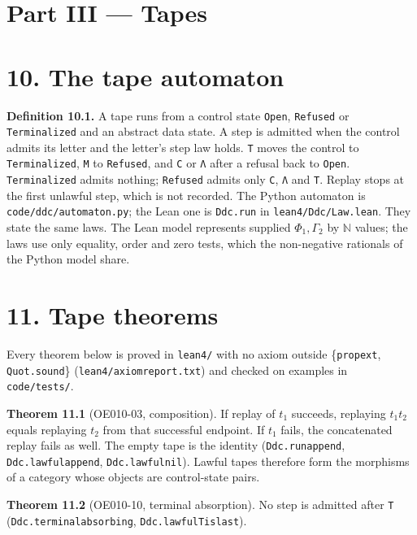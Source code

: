 \documentclass[
  11pt,
]{article}
\renewcommand{\_}{\ddcunderscore\allowbreak}
\begin{document}
\section{Part III --- Tapes}\label{part-iii-tapes}

\section{10. The tape automaton}\label{the-tape-automaton}

\textbf{Definition 10.1.} A tape runs from a control state
\texttt{Open}, \texttt{Refused} or \texttt{Terminalized} and an abstract
data state. A step is admitted when the control admits its letter and
the letter's step law holds. \texttt{T} moves the control to
\texttt{Terminalized}, \texttt{M} to \texttt{Refused}, and \texttt{C} or
\texttt{Λ} after a refusal back to \texttt{Open}. \texttt{Terminalized}
admits nothing; \texttt{Refused} admits only \texttt{C}, \texttt{Λ} and
\texttt{T}. Replay stops at the first unlawful step, which is not
recorded. The Python automaton is \texttt{code/\allowbreak ddc/\allowbreak automaton.\allowbreak py}; the
Lean one is \texttt{Ddc.\allowbreak run} in \texttt{lean4/\allowbreak Ddc/\allowbreak Law.\allowbreak lean}. They state
the same laws. The Lean model represents supplied \(\Phi_1, \Gamma_2\)
by \(\mathbb{N}\) values; the laws use only equality, order and zero
tests, which the non-negative rationals of the Python model share.

\section{11. Tape theorems}\label{tape-theorems}

Every theorem below is proved in \texttt{lean4/\allowbreak } with no axiom outside
\{\texttt{propext}, \texttt{Quot.\allowbreak sound}\}
(\texttt{lean4/\allowbreak axiom\_report.\allowbreak txt}) and checked on examples in
\texttt{code/\allowbreak tests/\allowbreak }.

\textbf{Theorem 11.1} (OE010-03, composition). If replay of \(t_1\)
succeeds, replaying \(t_1 t_2\) equals replaying \(t_2\) from that
successful endpoint. If \(t_1\) fails, the concatenated replay fails as
well. The empty tape is the identity (\texttt{Ddc.\allowbreak run\_append},
\texttt{Ddc.\allowbreak lawful\_append}, \texttt{Ddc.\allowbreak lawful\_nil}). Lawful tapes
therefore form the morphisms of a category whose objects are
control-state pairs.

\textbf{Theorem 11.2} (OE010-10, terminal absorption). No step is
admitted after \texttt{T} (\texttt{Ddc.\allowbreak terminal\_absorbing},
\texttt{Ddc.\allowbreak lawful\_T\_is\_last}).
\end{document}
